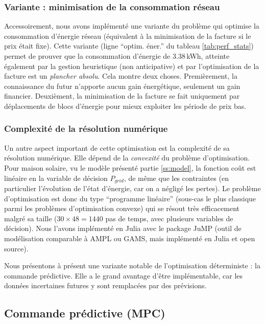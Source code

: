 \documentclass[a4paper,10pt,twocolumn]{article}
\begin{document}
\subsubsection{Variante : minimisation de la consommation réseau}
Accessoirement, nous avons implémenté une variante du problème
qui optimise la consommation d'énergie réseau 
(équivalent à la minimisation de la facture si le prix était fixe).
Cette variante (ligne ``optim. éner.'' du tableau \ref{tab:perf_stats})
permet de prouver que la consommation d'énergie de 3.38\,kWh,
atteinte également par la gestion heuristique (non anticipative)
et par l'optimisation de la facture est un \emph{plancher absolu}.
Cela montre deux choses.
Premièrement, la connaissance du futur n'apporte aucun gain énergétique,
seulement un gain financier.
Deuxièment, la minimisation de la facture se fait uniquement
par déplacements de blocs d'énergie pour mieux exploiter les
période de prix bas.

\subsubsection{Complexité de la résolution numérique}
\label{sss:opt_complex}

Un autre aspect important de cette optimisation est la complexité
de sa résolution numérique. Elle dépend de la \emph{convexité}
\cite{Boyd:2004:CvxOptim} du problème d'optimisation.
Pour maison solaire, vu le modèle présenté partie \ref{ss:model},
la fonction coût est linéaire en la variable de décision $P_{grid}$,
de même que les contraintes (en particulier l'évolution de l'état d'énergie,
car on a négligé les pertes).
Le problème d'optimisation est donc du type ``programme linéaire''
(sous-cas le plus classique parmi les problèmes d'optimisation convexe)
qui se résout très efficacement malgré sa taille
($30 \times 48 = 1440$ pas de temps, avec plusieurs variables de décision).
Nous l'avons implémenté en Julia avec le package JuMP\cite{Dunning:2017:JuMP}
(outil de modélisation comparable à AMPL ou GAMS, mais implémenté en Julia
et open source).

Nous présentons à présent une variante notable de l'optimisation déterministe : la commande prédictive.
Elle a le grand avantage d'être implémentable, car les données incertaines futures y sont remplacées
par des prévisions.

\subsection{Commande prédictive (MPC)}
\label{ss:mpc}
\end{document}
